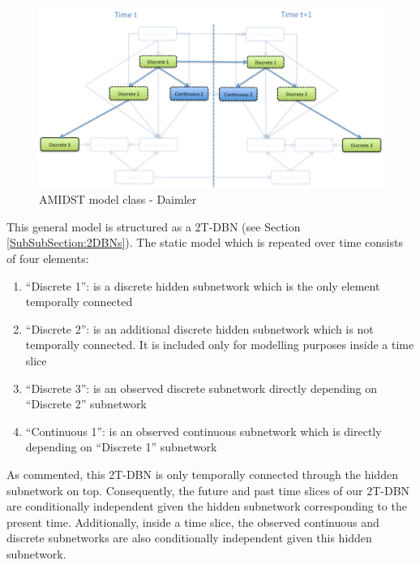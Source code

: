 \begin{figure}[ht!]
\begin{center}
\includegraphics[scale=0.39]{./figures/AMIDSTModelClassDaimler}
\caption{\label{Figure:AMIDSTModelClassDaimler} AMIDST model class - Daimler}
\end{center}
\end{figure}


This general model is structured as a 2T-DBN (see Section \ref{SubSubSection:2DBNs}). The static model which is repeated over time consists of four elements: 

\begin{enumerate}
\item ``Discrete 1'': is a discrete hidden subnetwork which is the only element temporally connected
\item ``Discrete 2'': is an additional discrete hidden subnetwork which is not temporally connected. It is included only for modelling purposes inside a time slice
\item ``Discrete 3'': is an observed discrete subnetwork directly depending on ``Discrete 2'' subnetwork
\item  ``Continuous 1'': is an observed continuous subnetwork which is directly depending on ``Discrete 1'' subnetwork
\end{enumerate}

As commented, this 2T-DBN is only temporally connected through the hidden subnetwork on top. Consequently, the future and past time slices of our 2T-DBN are conditionally independent given the hidden subnetwork corresponding to the present time. Additionally, inside a time slice, the observed continuous and discrete subnetworks are also conditionally independent given this hidden subnetwork.

